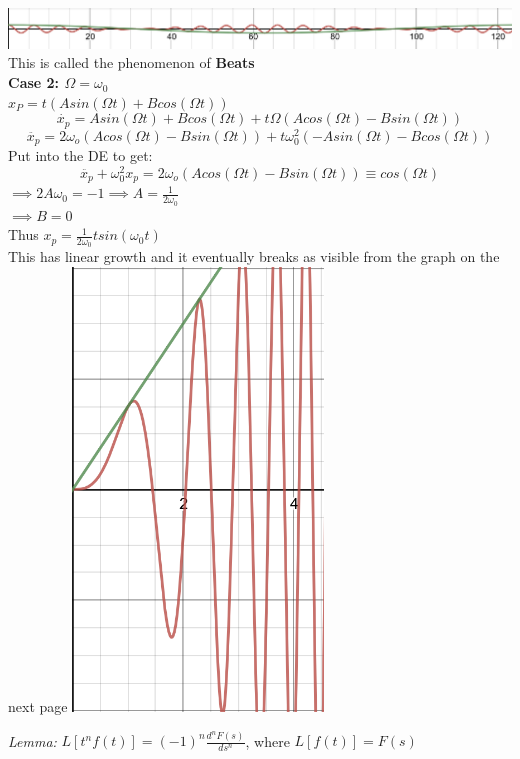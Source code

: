 \documentclass[11pt]{article}
\theoremstyle{definition}
\begin{document}
\begin{enumerate}[topsep=-10pt]
\includegraphics[width=\textwidth]{coscos.png}\\
This is called the phenomenon of \textbf{Beats}\\
\textbf{Case 2: $\Omega = \omega_0$}\\
$x_P = t(Asin(\Omega t) + Bcos(\Omega t))$
$$\dot{x_p} = Asin(\Omega t) + Bcos(\Omega t) + t\Omega(Acos(\Omega t) - Bsin(\Omega t))$$
$$\ddot{x_p} = 2\omega_o(Acos(\Omega t) - Bsin(\Omega t)) + t\omega_0^2(-Asin(\Omega t) - Bcos(\Omega t))$$
Put into the DE to get:
$$\ddot{x_p} + \omega_0^2x_p = 2\omega_o(Acos(\Omega t) - Bsin(\Omega t)) \equiv cos(\Omega t)$$
$\implies 2A\omega_0 = -1 \implies A = \frac{1}{2\omega_0}$\\
$\implies B = 0$\\
Thus $x_p = \frac{1}{2\omega_0}tsin(\omega_0 t)$\\
This has linear growth and it eventually breaks as visible from the graph on the next page
\includegraphics[width=0.5\textwidth]{resonance.png}
\end{enumerate}
\newpage


\textit{Lemma:} $L[t^nf(t)] = (-1)^n\frac{d^nF(s)}{ds^n}$, where $L[f(t)] = F(s)$
\end{document}
